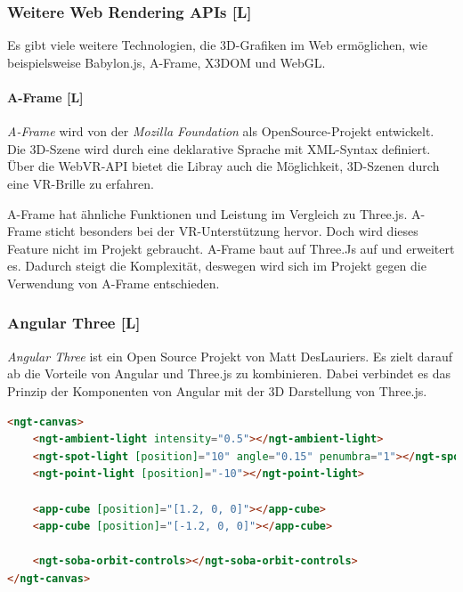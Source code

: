 \subsubsection{Weitere Web Rendering APIs [L]}
Es gibt viele weitere Technologien, die 3D-Grafiken im Web ermöglichen, wie beispielsweise Babylon.js, A-Frame, X3DOM und WebGL.

\paragraph{A-Frame [L]}
\emph{A-Frame} wird von der \emph{Mozilla Foundation} als OpenSource-Projekt entwickelt. Die 3D-Szene wird durch eine deklarative Sprache mit XML-Syntax definiert. Über die WebVR-API bietet die Libray auch die Möglichkeit, 3D-Szenen durch eine VR-Brille zu erfahren. \cite{a-frame-wiki}

A-Frame hat ähnliche Funktionen und Leistung im Vergleich zu Three.js. A-Frame sticht besonders bei der VR-Unterstützung hervor. Doch wird dieses Feature nicht im Projekt gebraucht. A-Frame baut auf Three.Js auf und erweitert es. Dadurch steigt die Komplexität, deswegen wird sich im Projekt gegen die Verwendung von A-Frame entschieden. \cite{a-frame-wiki}

\subsubsection{Angular Three [L]}
\label{ch:Technologien:AngularThree}
\emph{Angular Three} ist ein Open Source Projekt von Matt DesLauriers. Es zielt darauf ab die Vorteile von Angular und Three.js zu kombinieren. Dabei verbindet es das Prinzip der Komponenten von Angular mit der 3D Darstellung von Three.js. 

\begin{lstlisting}[language=html,caption=Angular Three - Komponentenbasiertes 3D Scenen in HTML  \cite{AngularThreeDocumentationFirstScene},label=lst:impl:AngularThreeExampleCode]
<ngt-canvas>
    <ngt-ambient-light intensity="0.5"></ngt-ambient-light>
    <ngt-spot-light [position]="10" angle="0.15" penumbra="1"></ngt-spot-light>
    <ngt-point-light [position]="-10"></ngt-point-light>
  
    <app-cube [position]="[1.2, 0, 0]"></app-cube>
    <app-cube [position]="[-1.2, 0, 0]"></app-cube>
  
    <ngt-soba-orbit-controls></ngt-soba-orbit-controls>
</ngt-canvas>
\end{lstlisting}

